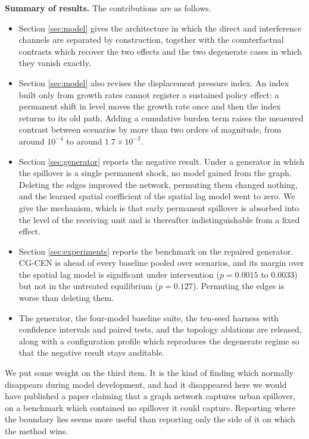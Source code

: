 \documentclass[journal]{IEEEtran}
\newcommand{\CGCEN}{CG\mbox{-}CEN}
\begin{document}
\textbf{Summary of results.} The contributions are as follows.

\begin{itemize}
\item[--] Section \ref{sec:model} gives the architecture in which the direct and
interference channels are separated by construction, together with the
counterfactual contrasts which recover the two effects and the two degenerate
cases in which they vanish exactly.

\item[--] Section \ref{sec:model} also revises the displacement pressure index.
An index built only from growth rates cannot register a sustained policy effect:
a permanent shift in level moves the growth rate once and then the index returns
to its old path. Adding a cumulative burden term raises the measured contrast
between scenarios by more than two orders of magnitude, from around $10^{-4}$ to
around $1.7 \times 10^{-2}$.

\item[--] Section \ref{sec:generator} reports the negative result. Under a
generator in which the spillover is a single permanent shock, no model gained
from the graph. Deleting the edges improved the network, permuting them changed
nothing, and the learned spatial coefficient of the spatial lag model went to
zero. We give the mechanism, which is that early permanent spillover is
absorbed into the level of the receiving unit and is thereafter
indistinguishable from a fixed effect.

\item[--] Section \ref{sec:experiments} reports the benchmark on the repaired
generator. \CGCEN{} is ahead of every baseline pooled over scenarios, and its
margin over the spatial lag model is significant under intervention
($p = 0.0015$ to $0.0033$) but not in the untreated equilibrium
($p = 0.127$). Permuting the edges is worse than deleting them.

\item[--] The generator, the four-model baseline suite, the ten-seed harness
with confidence intervals and paired tests, and the topology ablations are
released, along with a configuration profile which reproduces the degenerate
regime so that the negative result stays auditable.
\end{itemize}

We put some weight on the third item. It is the kind of finding which normally
disappears during model development, and had it disappeared here we would have
published a paper claiming that a graph network captures urban spillover, on a
benchmark which contained no spillover it could capture. Reporting where the
boundary lies seems more useful than reporting only the side of it on which the
method wins.
\end{document}

